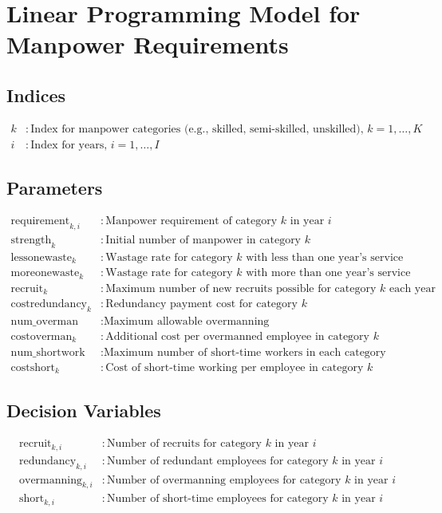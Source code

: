 \documentclass{article}
\begin{document}
\section*{Linear Programming Model for Manpower Requirements}

\subsection*{Indices}
\begin{align*}
k & : \text{Index for manpower categories (e.g., skilled, semi-skilled, unskilled), } k = 1, \ldots, K \\
i & : \text{Index for years, } i = 1, \ldots, I
\end{align*}

\subsection*{Parameters}
\begin{align*}
\text{requirement}_{k,i} & : \text{Manpower requirement of category } k \text{ in year } i \\
\text{strength}_k & : \text{Initial number of manpower in category } k \\
\text{lessonewaste}_k & : \text{Wastage rate for category } k \text{ with less than one year's service} \\
\text{moreonewaste}_k & : \text{Wastage rate for category } k \text{ with more than one year's service} \\
\text{recruit}_k & : \text{Maximum number of new recruits possible for category } k \text{ each year} \\
\text{costredundancy}_k & : \text{Redundancy payment cost for category } k \\
\text{num\_overman} & : \text{Maximum allowable overmanning} \\
\text{costoverman}_k & : \text{Additional cost per overmanned employee in category } k \\
\text{num\_shortwork} & : \text{Maximum number of short-time workers in each category} \\
\text{costshort}_k & : \text{Cost of short-time working per employee in category } k
\end{align*}

\subsection*{Decision Variables}
\begin{align*}
\text{recruit}_{k,i} & : \text{Number of recruits for category } k \text{ in year } i \\
\text{redundancy}_{k,i} & : \text{Number of redundant employees for category } k \text{ in year } i \\
\text{overmanning}_{k,i} & : \text{Number of overmanning employees for category } k \text{ in year } i \\
\text{short}_{k,i} & : \text{Number of short-time employees for category } k \text{ in year } i 
\end{align*}
\end{document}

